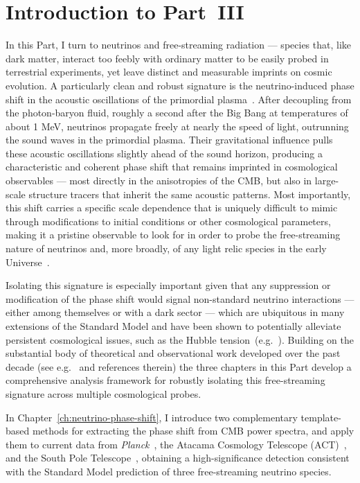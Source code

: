 \chapter*{Introduction to Part~III}
\label{ch:part3-intro}

In this Part, I turn to neutrinos and free-streaming radiation --- species that, like dark matter, interact too feebly with ordinary matter to be easily probed in terrestrial experiments, yet leave distinct and measurable imprints on cosmic evolution. A particularly clean and robust signature is the neutrino-induced phase shift in the acoustic oscillations of the primordial plasma~\cite{Bashinsky:2003tk}. After decoupling from the photon-baryon fluid, roughly a second after the Big Bang at temperatures of about 1 MeV, neutrinos propagate freely at nearly the speed of light, outrunning the sound waves in the primordial plasma. Their gravitational influence pulls these acoustic oscillations slightly ahead of the sound horizon, producing a characteristic and coherent phase shift that remains imprinted in cosmological observables --- most directly in the anisotropies of the CMB, but also in large-scale structure tracers that inherit the same acoustic patterns.  Most importantly, this shift carries a specific scale dependence that is uniquely difficult to mimic through modifications to initial conditions or other cosmological parameters, making it a pristine observable to look for in order to probe the free-streaming nature of neutrinos and, more broadly, of any light relic species in the early Universe~\cite{Baumann:2015rya}.

Isolating this signature is especially important given that any suppression or modification of the phase shift would signal non-standard neutrino interactions --- either among themselves or with a dark sector --- which are ubiquitous in many extensions of the Standard Model and have been shown to potentially alleviate persistent cosmological issues, such as the Hubble tension~(e.g.~\cite{Ghosh:2019tab}). Building on the substantial body of theoretical and observational work developed over the past decade (see e.g.~\cite{Wallisch:2018rzj, Montefalcone:2025ibh} and references therein) the three chapters in this Part develop a comprehensive analysis framework for robustly isolating this free-streaming signature across multiple cosmological probes.

In Chapter~\ref{ch:neutrino-phase-shift}, I introduce two complementary template-based methods for extracting the phase shift from CMB power spectra, and apply them to current data from \textit{Planck}~\cite{Planck:2018vyg}, the Atacama Cosmology Telescope (ACT)~\cite{ACT:2025fju}, and the South Pole Telescope~\cite{SPT-3G:2025bzu}, obtaining a high-significance detection consistent with the Standard Model prediction of three free-streaming neutrino species.

